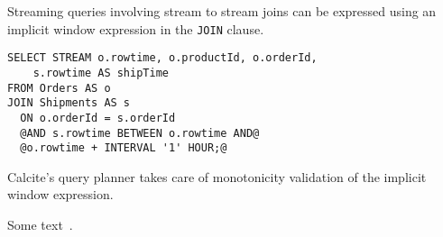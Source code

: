 Streaming queries involving stream to stream joins can be expressed using an implicit window expression in the \texttt{JOIN} clause. 

\begin{lstlisting}[style=STREAMINGSQL]
SELECT STREAM o.rowtime, o.productId, o.orderId, 
	s.rowtime AS shipTime
FROM Orders AS o
JOIN Shipments AS s
  ON o.orderId = s.orderId
  @AND s.rowtime BETWEEN o.rowtime AND@
  @o.rowtime + INTERVAL '1' HOUR;@
\end{lstlisting}

Calcite's query  planner takes care of monotonicity validation of the implicit window expression.




Some text~\cite{DBLP:journals/cacm/Hyde10}.
